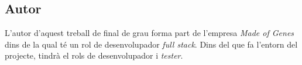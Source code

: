 \subsection{Autor}
\label{context:autor}
L'autor d'aquest treball de final de grau forma part de l'empresa \textit{Made of Genes} dins de la qual té un rol de desenvolupador \textit{full stack}.
Dins del que fa l'entorn del projecte, tindrà el rols de desenvolupador i \textit{tester}.\\
